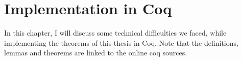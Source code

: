 \chapter{Implementation in Coq}
\label{chap:implementation}

In this chapter, I will discuss some technical difficulties we faced, while implementing the theorems of this thesis in Coq.
Note that the definitions, lemmas and theorems are linked to the online coq sources.


